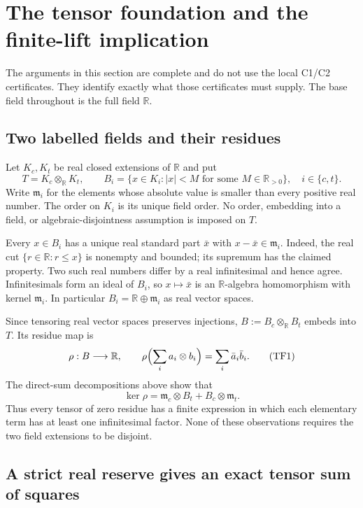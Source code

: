 \section{The tensor foundation and the finite-lift implication}
\label{sec:tensor-audit}

The arguments in this section are complete and do not use the local C1/C2
certificates. They identify exactly what those certificates must supply.
The base field throughout is the full field $\mathbb R$.

\subsection{Two labelled fields and their residues}
Let $K_c,K_t$ be real closed extensions of $\mathbb R$ and put
\[
 T=K_c\otimes_{\mathbb R}K_t,\qquad
 B_i=\{x\in K_i: |x|<M\text{ for some }M\in\mathbb R_{>0}\},
 \quad i\in\{c,t\}.
\]
Write $\mathfrak m_i$ for the elements whose absolute value is smaller
than every positive real number. The order on $K_i$ is its unique field
order. No order, embedding into a field, or algebraic-disjointness
assumption is imposed on $T$.

Every $x\in B_i$ has a unique real standard part $\bar x$ with
$x-\bar x\in\mathfrak m_i$. Indeed, the real cut
$\{r\in\mathbb R:r\le x\}$ is nonempty and bounded; its supremum
has the claimed property. Two such real numbers differ by a real
infinitesimal and hence agree. Infinitesimals form an ideal of $B_i$,
so $x\mapsto\bar x$ is an $\mathbb R$-algebra homomorphism with
kernel $\mathfrak m_i$. In particular
$B_i=\mathbb R\oplus\mathfrak m_i$ as real vector spaces.

Since tensoring real vector spaces preserves injections,
$B:=B_c\otimes_{\mathbb R}B_t$ embeds into $T$. Its residue map is
\[
 \rho:B\longrightarrow\mathbb R,\qquad
 \rho\Bigl(\sum_i a_i\otimes b_i\Bigr)=\sum_i\bar a_i\bar b_i.
 \tag{TF1}
\]
The direct-sum decompositions above show that
\[
 \ker\rho=\mathfrak m_c\otimes B_t+B_c\otimes\mathfrak m_t.
 \tag{TF2}
\]
Thus every tensor of zero residue has a finite expression in which
each elementary term has at least one infinitesimal factor. None of
these observations requires the two field extensions to be disjoint.

\subsection{A strict real reserve gives an exact tensor sum of squares}
